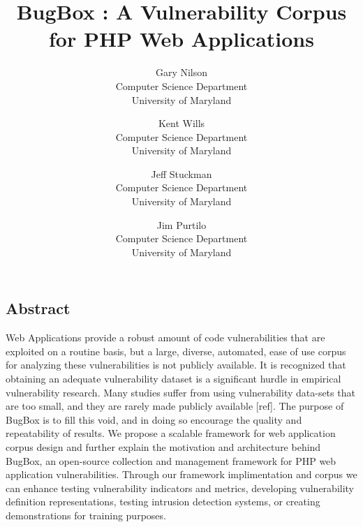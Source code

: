 \documentclass[letterpaper,twocolumn,10pt]{article}
\begin{document}
\date{}


\title{\Large \bf BugBox : A Vulnerability Corpus for PHP Web Applications}


\author{
{\rm Gary Nilson}\\
Computer Science Department\\University of Maryland
\and
{\rm Kent Wills}\\
Computer Science Department\\University of Maryland
\and
{\rm Jeff Stuckman}\\
Computer Science Department\\University of Maryland
\and
{\rm Jim Purtilo}\\
Computer Science Department\\University of Maryland
} %

\maketitle

\thispagestyle{empty}

\subsection*{Abstract}

Web Applications provide a robust amount of code vulnerabilities that are exploited on a routine basis, but a large, diverse, automated, ease of use corpus for analyzing these vulnerabilities is not publicly available.   It is recognized that obtaining an adequate vulnerability dataset is a significant hurdle in empirical vulnerability research.  Many studies suffer from using vulnerability data-sets that are too small, and they are rarely made publicly available [ref].  The purpose of BugBox is to fill this void, and in doing so encourage the quality and repeatability of results.  We propose a scalable framework for web application corpus design and further explain the motivation and architecture behind BugBox, an open-source collection and management framework for PHP web application vulnerabilities.  Through our framework implimentation and corpus we can enhance testing vulnerability indicators and metrics, developing vulnerability definition representations, testing intrusion detection systems, or creating demonstrations for training purposes.  
\end{document}
